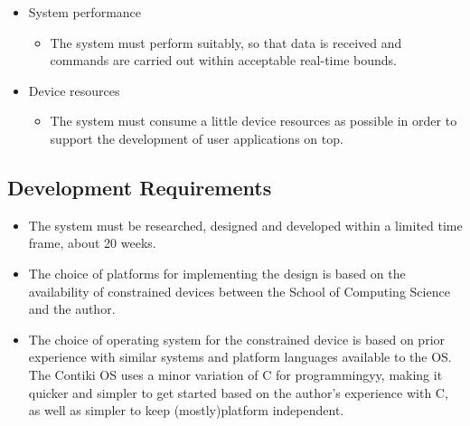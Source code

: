 \begin{itemize}
\begin{itemize}
	\end{itemize}
	\item System performance
	\begin{itemize}
		\item The system must perform suitably, so that data is received and commands are carried out within acceptable real-time bounds.
	\end{itemize}
	\item Device resources
	\begin{itemize}
		\item The system must consume a little device resources as possible in order to support the development of user applications on top.
	\end{itemize}
\end{itemize}


\subsection{Development Requirements} %
\label{sub:development_requirements}
\begin{itemize}
	\item The system must be researched, designed and developed within a limited time frame, about 20 weeks.
	\item The choice of platforms for implementing the design is based on the availability of constrained devices between the School of Computing Science and the author.
	\item The choice of operating system for the constrained device is based on prior experience with similar systems and platform languages available to the OS. The Contiki OS uses a minor variation of C for programmingyy, making it quicker and simpler to get started based on the author's experience with C, as well as simpler to keep (mostly)platform independent.
\end{itemize}




\begin{comment}

\end{comment}





